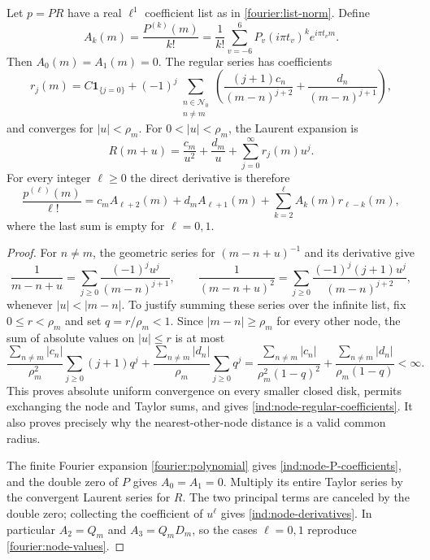 \begin{proposition}\label{ind:node-taylor-proposition}
Let $p=PR$ have a real $\ell^1$ coefficient list as in
\eqref{fourier:list-norm}.  Define
\begin{equation}\label{ind:node-P-coefficients}
 A_k(m)=\frac{P^{(k)}(m)}{k!}
 =\frac1{k!}\sum_{v=-6}^6P_v(i\pi t_v)^k e^{i\pi t_vm}.
\end{equation}
Then $A_0(m)=A_1(m)=0$.  The regular series has coefficients
\begin{equation}\label{ind:node-regular-coefficients}
 r_j(m)=C\mathbf1_{\{j=0\}}+
 (-1)^j\sum_{\substack{n\in\mathcal N_0\\n\ne m}}
 \left(\frac{(j+1)c_n}{(m-n)^{j+2}}
       +\frac{d_n}{(m-n)^{j+1}}\right),
\end{equation}
and converges for $|u|<\rho_m$.  For $0<|u|<\rho_m$, the Laurent
expansion is
\[
 R(m+u)=\frac{c_m}{u^2}+\frac{d_m}{u}
       +\sum_{j=0}^{\infty}r_j(m)u^j.
\]
For every integer $\ell\ge0$ the direct derivative is therefore
\begin{equation}\label{ind:node-derivatives}
 \frac{p^{(\ell)}(m)}{\ell!}
 =c_mA_{\ell+2}(m)+d_mA_{\ell+1}(m)
       +\sum_{k=2}^{\ell}A_k(m)r_{\ell-k}(m),
\end{equation}
where the last sum is empty for $\ell=0,1$.
\end{proposition}

\begin{proof}
For $n\ne m$, the geometric series for $(m-n+u)^{-1}$ and its derivative
give
\[
 \frac1{m-n+u}=\sum_{j\ge0}\frac{(-1)^ju^j}{(m-n)^{j+1}},\qquad
 \frac1{(m-n+u)^2}=\sum_{j\ge0}
       \frac{(-1)^j(j+1)u^j}{(m-n)^{j+2}},
\]
whenever $|u|<|m-n|$.  To justify summing these series over the infinite
list, fix $0\le r<\rho_m$ and set $q=r/\rho_m<1$.  Since
$|m-n|\ge\rho_m$ for every other node, the sum of absolute values on
$|u|\le r$ is at most
\[
 \frac{\sum_{n\ne m}|c_n|}{\rho_m^2}
       \sum_{j\ge0}(j+1)q^j
 +\frac{\sum_{n\ne m}|d_n|}{\rho_m}\sum_{j\ge0}q^j
 =
 \frac{\sum_{n\ne m}|c_n|}{\rho_m^2(1-q)^2}
 +\frac{\sum_{n\ne m}|d_n|}{\rho_m(1-q)}<\infty.
\]
This proves absolute uniform convergence on every smaller closed disk,
permits exchanging the node and Taylor sums, and gives
\eqref{ind:node-regular-coefficients}.  It also proves precisely why the
nearest-other-node distance is a valid common radius.

The finite Fourier expansion \eqref{fourier:polynomial} gives
\eqref{ind:node-P-coefficients}, and the double zero of $P$ gives
$A_0=A_1=0$.  Multiply its entire Taylor series by the convergent Laurent
series for $R$.  The two principal terms are canceled by the double zero;
collecting the coefficient of $u^\ell$ gives
\eqref{ind:node-derivatives}.  In particular $A_2=Q_m$ and $A_3=Q_mD_m$,
so the cases $\ell=0,1$ reproduce \eqref{fourier:node-values}.
\end{proof}


